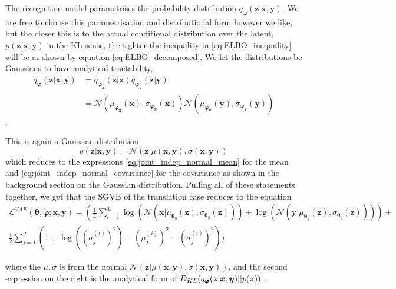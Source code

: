 The recognition model parametrises the probability distribution
$q_{\bm{\varphi}}(\bm{z} | \bm{x}, \bm{y})$. We are free to choose this
parametrisation and distributional form however we like, but the closer this is to the actual conditional distribution over the
latent, $p(\bm{z} | \bm{x}, \bm{y})$ in the KL sense, the tighter the
inequality in \eqref{eq:ELBO_inequality} will be as shown by equation
\eqref{eq:ELBO_decomposed}. We let the distributions be Gaussians to have
analytical tractability, 
\begin{align*}
  q_{\bm{\varphi}}(\bm{z} | \bm{x}, \bm{y}) & = q_{\bm{\varphi}_{\bm{x}}}(\bm{z} | \bm{x})q_{\bm{\varphi}_{\bm{y}}}(\bm{z} | \bm{y}) \\
                                            & = \mathcal{N}(\mu_{\bm{\varphi}_{\bm{x}}}(\bm{x}), \sigma_{\bm{\varphi}_{\bm{x}}}(\bm{x}))\mathcal{N}(\mu_{\bm{\varphi}_{\bm{y}}}(\bm{y}), \sigma_{\bm{\varphi}_{\bm{y}}}(\bm{y}))
\end{align*}.

This is again a Gaussian distribution
\begin{equation*}
  q(\bm{z} | \bm{x}, \bm{y}) = \mathcal{N}(\bm{z} | \mu(\bm{x}, \bm{y}), \sigma(\bm{x}, \bm{y}))
\end{equation*} which reduces to the expressions
\eqref{eq:joint_indep_normal_mean} for the mean and
\eqref{eq:joint_indep_normal_covariance} for the covariance as shown in the
background section on the Gaussian distribution.
Pulling all of these statements together, we get that the SGVB of the
translation case reduces to the equation
\begin{equation}
  \begin{split}
  \label{eq:translation_SGVB}
  \mathcal{L}^{VAE}(\bm{\theta}, \bm{\varphi}; \bm{x}, \bm{y}) = (\frac{1}{L} \sum_{l=1}^L \log(\mathcal{N}(\bm{x} | \mu_{\bm{\theta}_y}(\bm{z}), \sigma_{\bm{\theta}_y}(\bm{z}))) + \log(\mathcal{N}(\bm{y} | \mu_{\bm{\theta}_y}(\bm{z}), \sigma_{\bm{\theta}_y}(\bm{z})))) + \\ \frac{1}{2} \sum_{j=1}^J(1 + \log((\sigma_j^{(i)})^2) - (\mu_j^{(i)})^2 - (\sigma_j^{(i)})^2))
  \end{split}
\end{equation}

where the $\mu, \sigma$ is from the normal $\mathcal{N}(\bm{z} | \mu(\bm{x},
\bm{y}), \sigma(\bm{x}, \bm{y}))$, and the second expression on the right is the
analytical form of $D_{KL}(q_{\bm{\varphi}}(\bm{z} | \bm{x}, \bm{y}) || p(\bm{z}))$ \cite{kingma_auto-encoding_2013}.

